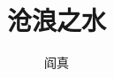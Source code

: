 \documentclass[12pt,oneside]{book}
\begin{document}
\title{沧浪之水}
\author{阎真}

\makemytitleA
\end{document}
